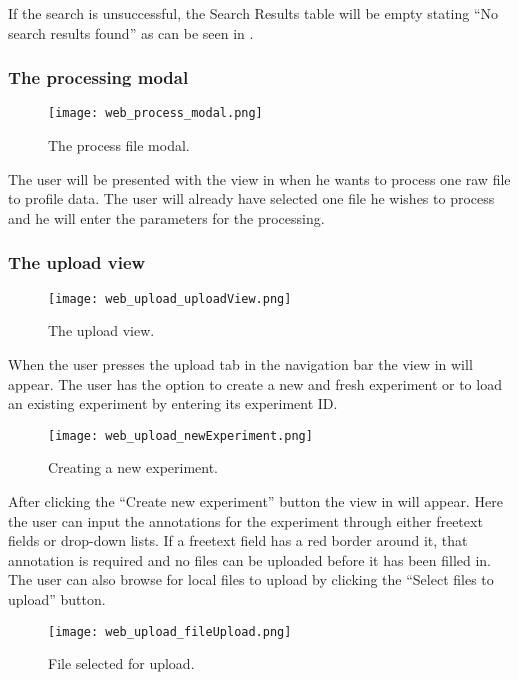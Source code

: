 If the search is unsuccessful, the Search Results table will be empty stating “No search results found” as can be seen in .

\subsubsection{The processing modal}
\begin{figure}[ht]
\centering
\texttt{[image: web\_process\_modal.png]}
\caption{\label{fig:web_process_modal}The process file modal.}
\end{figure}

The user will be presented with the view in  when he wants to process one raw file to profile data. The user will already have selected one file he wishes to process and he will enter the parameters for the processing.
\subsubsection{The upload view}
\begin{figure}[h]
\centering
\texttt{[image: web\_upload\_uploadView.png]}
\caption{\label{fig:web_upload_uploadView}The upload view.}
\end{figure}

When the user presses the upload tab in the navigation bar the view in  will appear. The user has the option to create a new and fresh experiment or to load an existing experiment by entering its experiment ID. 
\begin{figure}[h]
\centering
\texttt{[image: web\_upload\_newExperiment.png]}
\caption{\label{fig:web_upload_newExperiment}Creating a new experiment.}
\end{figure}

After clicking the “Create new experiment” button the view in  will appear. Here the user can input the annotations for the experiment through either freetext fields or drop-down lists. If a freetext field has a red border around it, that annotation is required and no files can be uploaded before it has been filled in. The user can also browse for local files to upload by clicking the “Select files to upload” button. 
\begin{figure}[h]
\centering
\texttt{[image: web\_upload\_fileUpload.png]}
\caption{\label{fig:web_upload_fileUpload}File selected for upload.}
\end{figure}
 
